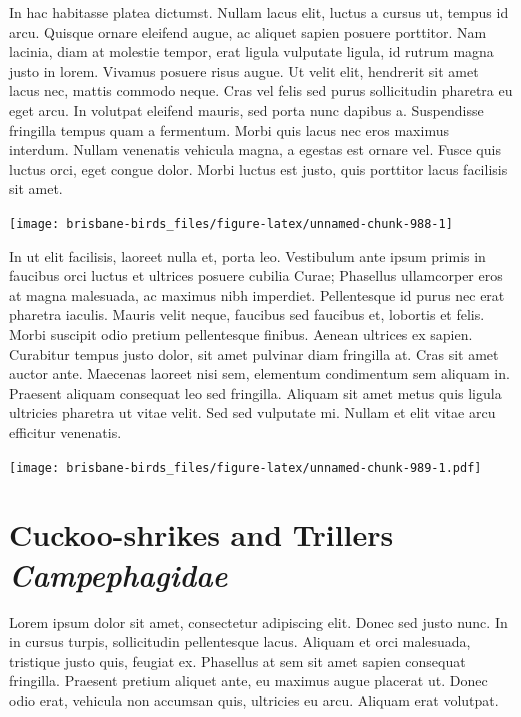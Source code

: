 \documentclass[]{book}
\let\origfigure\figure
\let\endorigfigure\endfigure
\renewenvironment{figure}[1][2] {
  \expandafter\origfigure\expandafter[H]
} {
  \endorigfigure
}
\begin{document}
In hac habitasse platea dictumst. Nullam lacus elit, luctus a cursus ut,
tempus id arcu. Quisque ornare eleifend augue, ac aliquet sapien posuere
porttitor. Nam lacinia, diam at molestie tempor, erat ligula vulputate
ligula, id rutrum magna justo in lorem. Vivamus posuere risus augue. Ut
velit elit, hendrerit sit amet lacus nec, mattis commodo neque. Cras vel
felis sed purus sollicitudin pharetra eu eget arcu. In volutpat eleifend
mauris, sed porta nunc dapibus a. Suspendisse fringilla tempus quam a
fermentum. Morbi quis lacus nec eros maximus interdum. Nullam venenatis
vehicula magna, a egestas est ornare vel. Fusce quis luctus orci, eget
congue dolor. Morbi luctus est justo, quis porttitor lacus facilisis sit
amet.

\begin{figure}
\texttt{[image: brisbane-birds\_files/figure-latex/unnamed-chunk-988-1]} \caption{insert figure caption}\label{fig:unnamed-chunk-988}
\end{figure}

In ut elit facilisis, laoreet nulla et, porta leo. Vestibulum ante ipsum
primis in faucibus orci luctus et ultrices posuere cubilia Curae;
Phasellus ullamcorper eros at magna malesuada, ac maximus nibh
imperdiet. Pellentesque id purus nec erat pharetra iaculis. Mauris velit
neque, faucibus sed faucibus et, lobortis et felis. Morbi suscipit odio
pretium pellentesque finibus. Aenean ultrices ex sapien. Curabitur
tempus justo dolor, sit amet pulvinar diam fringilla at. Cras sit amet
auctor ante. Maecenas laoreet nisi sem, elementum condimentum sem
aliquam in. Praesent aliquam consequat leo sed fringilla. Aliquam sit
amet metus quis ligula ultricies pharetra ut vitae velit. Sed sed
vulputate mi. Nullam et elit vitae arcu efficitur venenatis.

\begin{figure}
\centering
\texttt{[image: brisbane-birds\_files/figure-latex/unnamed-chunk-989-1.pdf]}
\caption{\label{fig:unnamed-chunk-989}insert figure caption}
\end{figure}

\chapter{\texorpdfstring{Cuckoo-shrikes and Trillers
\emph{Campephagidae}}{Cuckoo-shrikes and Trillers Campephagidae}}\label{cuckoo-shrikes-and-trillers-campephagidae}

Lorem ipsum dolor sit amet, consectetur adipiscing elit. Donec sed justo
nunc. In in cursus turpis, sollicitudin pellentesque lacus. Aliquam et
orci malesuada, tristique justo quis, feugiat ex. Phasellus at sem sit
amet sapien consequat fringilla. Praesent pretium aliquet ante, eu
maximus augue placerat ut. Donec odio erat, vehicula non accumsan quis,
ultricies eu arcu. Aliquam erat volutpat.
\end{document}
